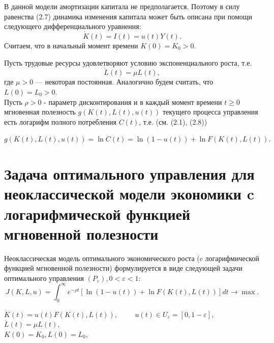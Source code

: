 В данной модели амортизации капитала не предполагается. Поэтому в силу равенства (2.7) динамика изменения капитала может быть описана при помощи следующего дифференциального уравнения: 
\begin{equation}
\dot{K}(t)=I(t)=u(t)Y (t). 
\end{equation}
Считаем, что в начальный момент времени $ K(0) = K_0 > 0.  $

Пусть трудовые ресурсы удовлетворяют условию экспоненциального роста, т.е. 
\begin{equation}
\dot{L}(t)=\mu L(t),
\end{equation}
где $ \mu>0 $ --- некоторая постоянная. Аналогично будем считать, что $ L(0) = L_0 > 0.  $\\
Пусть $  \rho>0 $ - параметр дисконтирования и в каждый момент времени $ t \ge 0 $ мгновенная полезность $ g(K(t),L(t),u(t)) $ текущего процесса управления есть логарифм полного потребления $ C(t) $, т.е. (см. (2.1), (2.8))
\begin{center}
	$ 	g(K(t),L(t),u(t)) = \ln C(t) = \ln (1-u(t))+\ln F(K(t),L(t)).  $
\end{center} 

\section{Задача оптимального управления для неоклассической модели экономики c логарифмической функцией мгновенной полезности}
Неоклассическая модель оптимального экономического роста (c логарифмической функцией мгновенной полезности) формулируется в виде следующей задачи оптимального управления $ (P_\varepsilon), 0 <\varepsilon<1 $: 
\begin{equation}
J(K,L,u)= \int_{0}^{\infty}
e^{-\rho t}[\ln(1-u(t))+\ln F(K(t),L(t))]dt \rightarrow \max.
\end{equation}
\begin{center}
	$ \dot{K}(t)=u(t)F(K(t),L(t)),\hspace{1cm} u(t)\in U_\varepsilon = [0 ,1-\varepsilon],  $\\
	$\dot{L}(t)=\mu L(t),$\\
	$ K(0) = K_0,L (0) = L_0, $
\end{center} 

